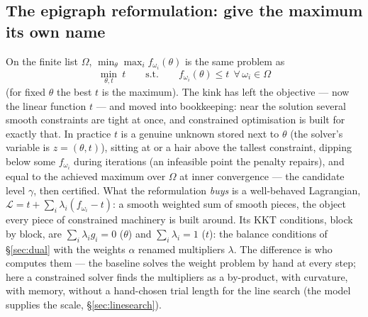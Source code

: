 \documentclass[11pt,a4paper]{article}
\newcommand{\rev}[1]{#1}
\begin{document}
\subsection{The epigraph reformulation: give the maximum its own name}
\label{sec:epigraph}
On the finite list $\Omega$, $\min_\theta\max_if_{\omega_i}(\theta)$ is the same problem as
\[
\min_{\theta,t}\ t\qquad\text{s.t.}\qquad f_{\omega_i}(\theta)\le t\ \ \forall\,\omega_i\in\Omega
\]
(for fixed $\theta$ the best $t$ is the maximum).  The kink has left the objective ---
now the linear function $t$ --- and moved into bookkeeping: near the solution several
smooth constraints are tight at once, and constrained optimisation is built for exactly
that.  In practice $t$ is a genuine unknown stored next to $\theta$ (the solver's
variable is $z=(\theta,t)$), sitting at or a hair above the tallest constraint, dipping
below some $f_{\omega_i}$ during iterations (an infeasible point the penalty repairs), and
equal to the achieved maximum over $\Omega$ at inner convergence --- the candidate level
$\gamma$, then certified.  What the reformulation \emph{buys} is a well-behaved
Lagrangian, $\mathcal L=t+\sum_i\lambda_i(f_{\omega_i}-t)$: a smooth weighted sum of smooth
pieces, the object every piece of constrained machinery is built around.  Its KKT
conditions, block by block, are $\sum_i\lambda_ig_i=0$ ($\theta$) and $\sum_i\lambda_i=1$
($t$): the balance conditions of \S\ref{sec:dual} with the weights $\alpha$ renamed
multipliers $\lambda$.  The difference is who computes them --- the baseline solves the
weight problem by hand at every step; here a constrained solver finds the multipliers as a
by-product, with curvature, with memory, \rev{without a hand-chosen trial length for the line
search (the model supplies the scale, \S\ref{sec:linesearch}).}
\end{document}
